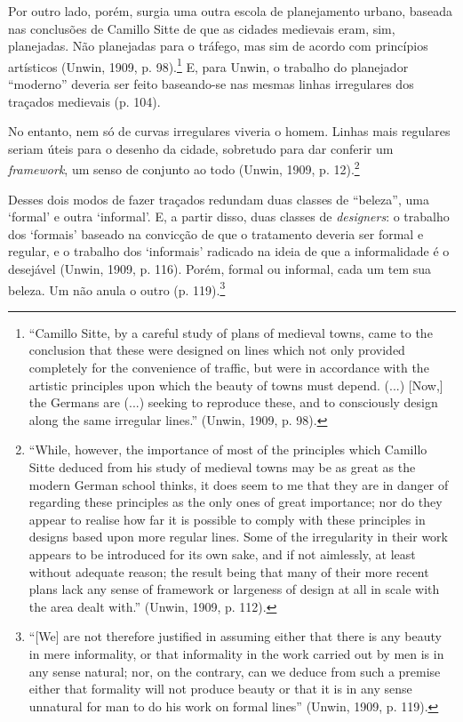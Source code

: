 \documentclass[12pt, a4paper]{book} %
\begin{document}
        Por outro lado, porém, surgia uma outra escola de planejamento urbano, baseada nas conclusões de Camillo Sitte de que as cidades medievais eram, sim, planejadas. Não planejadas para o tráfego, mas sim de acordo com princípios artísticos (Unwin, 1909, p. 98).\footnote[18]{``Camillo Sitte, by a careful study of plans of medieval towns, came to the conclusion that these were designed on lines which not only provided completely for the convenience of traffic, but were in accordance with the artistic principles upon which the beauty of towns must depend. (...) [Now,] the Germans are (...) seeking to reproduce these, and to consciously design along the same irregular lines.'' (Unwin, 1909, p. 98).} E, para Unwin, o trabalho do planejador ``moderno'' deveria ser feito baseando-se nas mesmas linhas irregulares dos traçados medievais (p. 104).
        
        No entanto, nem só de curvas irregulares viveria o homem. Linhas mais regulares seriam úteis para o desenho da cidade, sobretudo para dar conferir um \textit{framework}, um senso de conjunto ao todo (Unwin, 1909, p. 12).\footnote[19]{``While, however, the importance of most of the principles which Camillo Sitte deduced from his study of medieval towns may be as great as the modern German school thinks, it does seem to me that they are in danger of regarding these principles as the only ones of great importance; nor do they appear to realise how far it is possible to comply with these principles in designs based upon more regular lines. Some of the irregularity in their work appears to be introduced for its own sake, and if not aimlessly, at least without adequate reason; the result being that many of their more recent plans lack any sense of framework or largeness of design at all in scale with the area dealt with.'' (Unwin, 1909, p. 112).}
        
        Desses dois modos de fazer traçados redundam duas classes de ``beleza'', uma `formal' e outra `informal'. E, a partir disso, duas classes de \textit{designers}: o trabalho dos `formais' baseado na convicção de que o tratamento deveria ser formal e regular, e o trabalho dos `informais' radicado na ideia de que a informalidade é o desejável (Unwin, 1909, p. 116). Porém, formal ou informal, cada um tem sua beleza. Um não anula o outro (p. 119).\footnote[20]{``[We] are not therefore justified in assuming either that there is any beauty in mere informality, or that informality in the work carried out by men is in any sense natural; nor, on the contrary, can we deduce from such a premise either that formality will not produce beauty or that it is in any sense unnatural for man to do his work on formal lines'' (Unwin, 1909, p. 119).}
\end{document}
